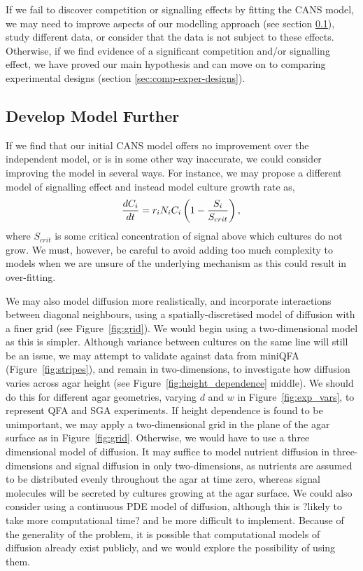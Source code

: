 If we fail to discover competition or signalling effects by fitting
the CANS model, we may need to improve aspects of our modelling
approach (see section \ref{sec:dev-mod-further}), study different
data, or consider that the data is not subject to these
effects. Otherwise, if we find evidence of a significant competition
and/or signalling effect, we have proved our main hypothesis and can
move on to comparing experimental designs (section
\ref{sec:comp-exper-designs}).

\subsection{Develop Model Further}
\label{sec:dev-mod-further}
If we find that our initial CANS model offers no improvement over the
independent model, or is in some other way inaccurate, we could
consider improving the model in several ways. For instance, we may
propose a different model of signalling effect and instead model
culture growth rate as,
\begin{equation}
  \label{eq:6}
  \frac{dC_{i}}{dt} = r_{i}N_{i}C_{i}\left(1 - \frac{S_{i}}{S_{crit}}\right),\\
\end{equation}
where \(S_{crit}\) is some critical concentration of signal above
which cultures do not grow. We must, however, be careful to avoid
adding too much complexity to models when we are unsure of the
underlying mechanism as this could result in over-fitting.

We may also model diffusion more realistically, and incorporate
interactions between diagonal neighbours, using a
spatially-discretised model of diffusion with a finer grid (see
Figure~\ref{fig:grid}). We would begin using a two-dimensional model
as this is simpler. Although variance between cultures on the same
line will still be an issue, we may attempt to validate against data
from miniQFA (Figure~\ref{fig:stripes}), and remain in two-dimensions,
to investigate how diffusion varies across agar height (see
Figure~\ref{fig:height_dependence} middle). We should do this for
different agar geometries, varying \(d\) and \(w\) in
Figure~\ref{fig:exp_vars}, to represent QFA and SGA experiments. If
height dependence is found to be unimportant, we may apply a
two-dimensional grid in the plane of the agar surface as in
Figure~\ref{fig:grid}. Otherwise, we would have to use a three
dimensional model of diffusion. It may suffice to model nutrient
diffusion in three-dimensions and signal diffusion in only
two-dimensions, as nutrients are assumed to be distributed evenly
throughout the agar at time zero, whereas signal molecules will be
secreted by cultures growing at the agar surface. We could also
consider using a continuous PDE model of diffusion, although this is
?likely to take more computational time? and be more difficult to
implement. Because of the generality of the problem, it is possible
that computational models of diffusion already exist publicly, and we
would explore the possibility of using them.


